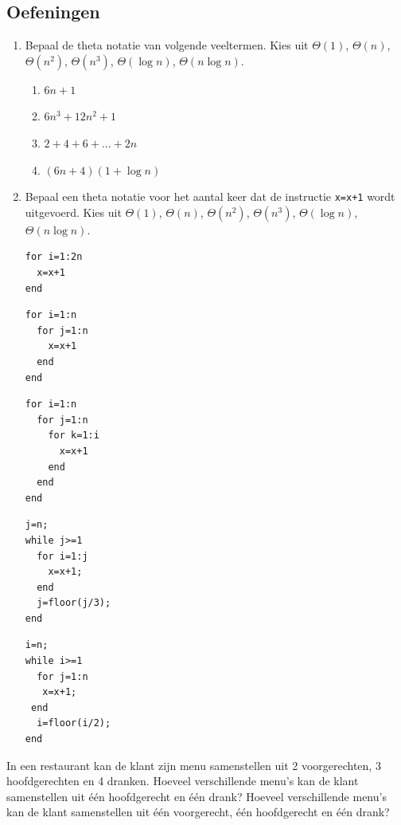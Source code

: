 \subsection{Oefeningen}
\begin{enumerate}

\item Bepaal de theta notatie van volgende veeltermen. Kies uit $\Theta(1)$, $\Theta(n)$, $\Theta(n^2)$, $\Theta(n^3)$, $\Theta(\log n)$, $\Theta(n\log n)$.
\begin{enumerate}
\item $6n+1$
\item $6n^3+12n^2+1$
\item $2+4+6+\dots+2n$
\item $(6n+4)(1+\log n)$
\end{enumerate}

\item Bepaal een theta notatie voor het aantal keer dat de instructie \lstinline{x=x+1} wordt uitgevoerd.
Kies uit $\Theta(1)$, $\Theta(n)$, $\Theta(n^2)$, $\Theta(n^3)$, $\Theta(\log n)$, $\Theta(n\log n)$.
\begin{lstlisting}[caption={Oefening 2.1}, label={lst:oef21}]
for i=1:2n
  x=x+1
end
\end{lstlisting}
\begin{lstlisting}[caption={Oefening 2.2}, label={lst:oef22}]
for i=1:n
  for j=1:n
    x=x+1
  end
end
\end{lstlisting}
\begin{lstlisting}[caption={Oefening 2.3}, label={lst:oef23}]
for i=1:n
  for j=1:n
    for k=1:i
      x=x+1
    end
  end
end
\end{lstlisting}
\begin{lstlisting}[caption={Oefening 2.4}, label={lst:oef24}]
j=n;
while j>=1
  for i=1:j
    x=x+1;
  end
  j=floor(j/3);
end
\end{lstlisting}
\begin{lstlisting}[caption={Oefening 2.5}, label={lst:oef25}]
i=n;
while i>=1
  for j=1:n
   x=x+1;
 end
  i=floor(i/2);
end

\end{lstlisting}
\end{enumerate}



In een restaurant kan de klant zijn menu samenstellen uit 2 voorgerechten, 3 hoofdgerechten en 4 dranken. Hoeveel verschillende menu's kan de klant samenstellen uit één hoofdgerecht en één drank? Hoeveel verschillende menu's kan de klant samenstellen uit één voorgerecht, één hoofdgerecht en één drank?

